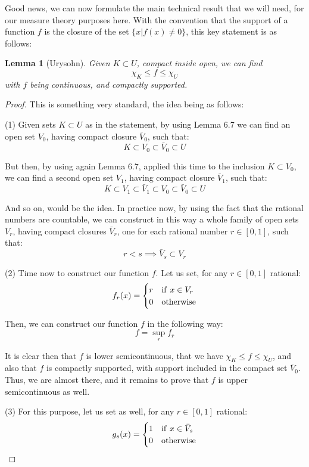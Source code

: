 \documentclass[12pt]{amsbook}
\newtheorem{lemma}[theorem]{Lemma}
\begin{document}
\bigskip

Good news, we can now formulate the main technical result that we will need, for our measure theory purposes here. With the convention that the support of a function $f$ is the closure of the set $\{x|f(x)\neq0\}$, this key statement is as follows:

\begin{lemma}[Urysohn]
Given $K\subset U$, compact inside open, we can find
$$\chi_K\leq f\leq\chi_U$$
with $f$ being continuous, and compactly supported.
\end{lemma}

\begin{proof}
This is something very standard, the idea being as follows:

\medskip

(1) Given sets $K\subset U$ as in the statement, by using Lemma 6.7 we can find an open set $V_0$, having compact closure $\bar{V}_0$, such that:
$$K\subset V_0\subset\bar{V}_0\subset U$$

But then, by using again Lemma 6.7, applied this time to the inclusion $K\subset V_0$, we can find a second open set $V_1$, having compact closure $\bar{V}_1$, such that:
$$K\subset V_1\subset\bar{V}_1\subset V_0\subset\bar{V}_0\subset U$$

And so on, would be the idea. In practice now, by using the fact that the rational numbers are countable, we can construct in this way a whole family of open sets $V_r$, having compact closures $\bar{V}_r$, one for each rational number $r\in[0,1]$, such that:
$$r<s\implies \bar{V}_s\subset V_r$$

(2) Time now to construct our function $f$. Let us set, for any $r\in[0,1]$ rational:
$$f_r(x)=\begin{cases}
r&{\rm if}\ x\in V_r\\
0&{\rm otherwise}
\end{cases}$$

Then, we can construct our function $f$ in the following way:
$$f=\sup_rf_r$$

It is clear then that $f$ is lower semicontinuous, that we have $\chi_K\leq f\leq\chi_U$, and also that $f$ is compactly supported, with support included in the compact set $\bar{V}_0$. Thus, we are almost there, and it remains to prove that $f$ is upper semicontinuous as well.

\medskip

(3) For this purpose, let us set as well, for any $r\in[0,1]$ rational:
$$g_s(x)=\begin{cases}
1&{\rm if}\ x\in\bar{V}_s\\
0&{\rm otherwise}
\end{cases}$$


\end{proof}
\end{document}
